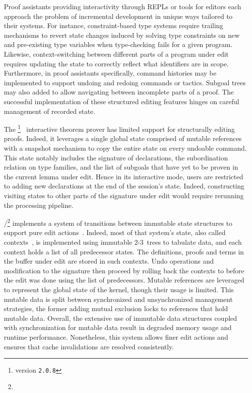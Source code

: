 Proof assistants providing interactivity through \acp{REPL} or tools for editors each approach the problem of incremental development in unique ways tailored to their systems.
For instance, constraint-based type systems require trailing mechanisms to revert state changes induced by solving type constraints on new and pre-existing type variables when type-checking fails for a given program.
Likewise, context-switching between different parts of a program under edit requires updating the state to correctly reflect what identifiers are in scope.
Furthermore, in proof assistants specifically, command histories may be implemented to support undoing and redoing commands or tactics.
Subgoal trees may also added to allow navigating between incomplete parts of a proof.
The successful implementation of these structured editing features hinges on careful management of recorded state.

The \Abella\footnote{\Abella version \texttt{2.0.8}}~\cite{baelde2014abella} interactive theorem prover has limited support for structurally editing proofs.
Indeed, it leverages a single global state comprised of mutable references with a snapshot mechanism to copy the entire state on every undoable command.
This state notably includes the signature of declarations, the subordination relation on type families, and the list of subgoals that have yet to be proven in the current lemma under edit.
Hence in its interactive mode, \Abella users are restricted to adding new declarations at the end of the session's state.
Indeed, constructing visiting states to other parts of the signature under edit would require rerunning the processing pipeline.

\Isabelle/\Isar\footnote{} implements a system of transitions between immutable state structures to support pure edit actions~\cite{wenzel2023isabelleimpl, wenzel2023isabelleisarref, wenzel2023isabellesys}.
Indeed, most of that system's state, also called contexts~\cite{ballarin2006interpretation}, is implemented using immutable 2-3~trees to tabulate data, and each context holds a list of all predecessor states.
The definitions, proofs and terms in the buffer under edit are stored in such contexts.
Undo operations and modification to the signature then proceed by rolling back the contexts to before the edit was done using the list of predecessors.
Mutable references are leveraged to represent the global state of the kernel, though their usage is limited.
This mutable data is split between synchronized and unsynchronized management strategies, the former adding mutual exclusion locks to references that hold mutable data.
Overall, the extensive use of immutable data structures coupled with synchronization for mutable data result in degraded memory usage and runtime performance.
Nonetheless, this system allows finer edit actions and ensures that cache invalidations are resolved consistently.

